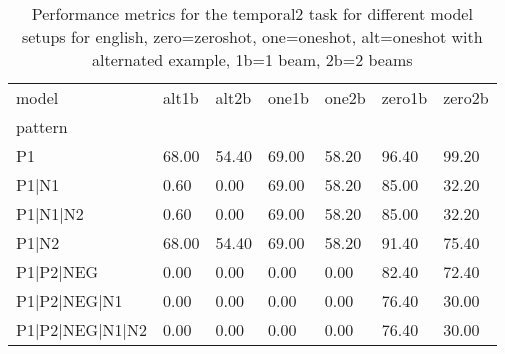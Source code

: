\begin{table}[h]
\begin{tabular}{l|llllll}
\toprule
model & alt1b & alt2b & one1b & one2b & zero1b & zero2b \\
pattern &  &  &  &  &  &  \\
\midrule
P1 & 68.00 & 54.40 & 69.00 & 58.20 & 96.40 & 99.20 \\
P1|N1 & 0.60 & 0.00 & 69.00 & 58.20 & 85.00 & 32.20 \\
P1|N1|N2 & 0.60 & 0.00 & 69.00 & 58.20 & 85.00 & 32.20 \\
P1|N2 & 68.00 & 54.40 & 69.00 & 58.20 & 91.40 & 75.40 \\
P1|P2|NEG & 0.00 & 0.00 & 0.00 & 0.00 & 82.40 & 72.40 \\
P1|P2|NEG|N1 & 0.00 & 0.00 & 0.00 & 0.00 & 76.40 & 30.00 \\
P1|P2|NEG|N1|N2 & 0.00 & 0.00 & 0.00 & 0.00 & 76.40 & 30.00 \\
\bottomrule
\end{tabular}
\caption{Performance metrics for the temporal2 task for different model setups for english, zero=zeroshot, one=oneshot, alt=oneshot with alternated example, 1b=1 beam, 2b=2 beams}
\label{tab:en_temporal2_performance}
\end{table}
